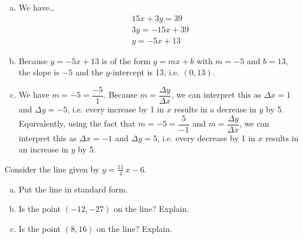 \documentclass[11pt,letterpaper]{article}
\begin{document}
\sol
\begin{enumerate}[(a)]
\item We have\dots \pspace
	\[
	\begin{aligned}
	15x + 3y= 39 \\[0.3cm]
	3y= -15x + 39 \\[0.3cm]
	y= -5x + 13
	\end{aligned}
	\] \pspace

\item Because $y= -5x + 13$ is of the form $y= mx + b$ with $m= -5$ and $b= 13$, the slope is $-5$ and the $y$-intercept is 13, i.e. $(0, 13)$. \pspace

\item We have $m= -5= \dfrac{-5}{1}$. Because $m= \dfrac{\Delta y}{\Delta x}$, we can interpret this as $\Delta x= 1$ and $\Delta y= -5$, i.e. every increase by 1 in $x$ results in a decrease in $y$ by 5. Equivalently, using the fact that $m= -5= \dfrac{5}{-1}$ and $m= \dfrac{\Delta y}{\Delta x}$, we can interpret this as $\Delta x= -1$ and $\Delta y= 5$, i.e. every decrease by 1 in $x$ results in an increase in $y$ by 5.
\end{enumerate}



\newpage



 Consider the line given by $y= \frac{11}{4}\,x - 6$.
        \begin{enumerate}[(a)]
        \item Put the line in standard form.
        \item Is the point $(-12, -27)$ on the line? Explain.
        \item Is the point $(8, 16)$ on the line? Explain. 
        \end{enumerate} \pspace
\end{document}
